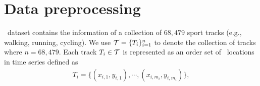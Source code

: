 
\section{Data preprocessing}

\edmd\ dataset contains the information of a collection of $68,479$ sport tracks (e.g., walking, running, cycling).
We use $\mathcal{T}=\{T_i\}_{i=1}^n$ to denote the collection of tracks where $n=68,479$.
Each track $T_i\in\mathcal{T}$ is represented as an order set of \gps\ locations in time series defined as
\begin{align*}
	T_i = \{(x_{i,1},y_{i,1}),\cdots,(x_{i,m_i},y_{i,m_i})\},
\end{align*}



